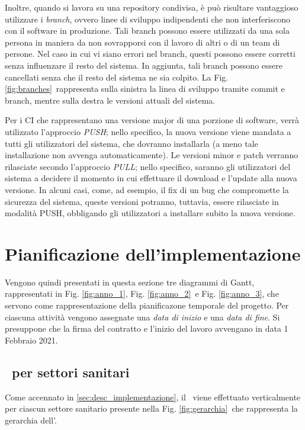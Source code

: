 	Inoltre, quando si lavora su una repository condivisa, è può risultare vantaggioso utilizzare i \textit{branch}, ovvero linee di sviluppo indipendenti che non interferiscono con il software in produzione.
	Tali branch possono essere utilizzati da una sola persona in maniera da non sovrapporsi con il lavoro di altri o di un team di persone.
	Nel caso in cui vi siano errori nel branch, questi possono essere corretti senza influenzare il resto del sistema.
	In aggiunta, tali branch possono essere cancellati senza che il resto del sistema ne sia colpito.
	La Fig. \ref{fig:branches}~rappresenta sulla sinistra la linea di sviluppo tramite commit e branch, mentre sulla destra le versioni attuali del sistema.
	
	Per i CI che rappresentano una versione major di una porzione di software, verrà utilizzato l'approccio \textit{PUSH}; nello specifico, la nuova versione viene mandata a tutti gli utilizzatori del sistema, che dovranno installarla (a meno tale installazione non avvenga automaticamente).
	Le versioni minor e patch verranno rilasciate secondo l'approccio \textit{PULL}; nello specifico, saranno gli utilizzatori del sistema a decidere il momento in cui effettuare il download e l'update alla nuova versione.
	In alcuni casi, come, ad esempio, il fix di un bug che compromette la sicurezza del sistema, queste versioni potranno, tuttavia, essere rilasciate in modalità PUSH, obbligando gli utilizzatori a installare subito la nuova versione.
	
\section{Pianificazione dell'implementazione}\label{sec:pianificazione}

	Vengono quindi presentati in questa sezione tre diagrammi di Gantt, rappresentati in Fig. \ref{fig:anno_1}, Fig. \ref{fig:anno_2}~e Fig. \ref{fig:anno_3}, che servono come rappresentazione della pianificazone temporale del progetto.
	Per ciascuna attività vengono assegnate una \textit{data di inizio} e una \textit{data di fine}.
	Si presuppone che la firma del contratto e l'inizio del lavoro avvengano in data 1 Febbraio 2021.
		
	\subsection{\rollout~per settori sanitari}	
	
		Come accennato in \ref{sec:desc_implementazione}, il \rollout~viene effettuato verticalmente per ciascun settore sanitario presente nella Fig. \ref{fig:gerarchia}~che rappresenta la gerarchia dell'\istituto.
		

